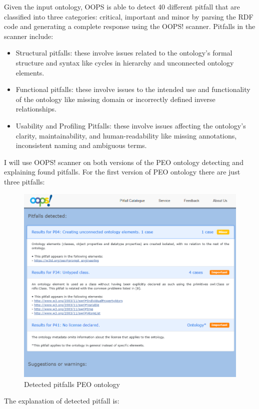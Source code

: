 Given the input ontology, OOPS is able to detect 40 different pitfall that are classified into three categories: critical, important and minor by parsing the RDF code and generating a complete response using the OOPS! scanner. Pitfalls in the scanner include:
\begin{itemize}
    \item Structural pitfalls: these involve issues related to the ontology's formal structure and syntax like cycles in hierarchy and unconnected ontology elements.

    \item Functional pitfalls: these involve issues to the intended use and functionality of the ontology like missing domain or incorrectly defined inverse relationships.

    \item Usability and Profiling Pitfalls: these involve issues  affecting the ontology's clarity, maintainability, and human-readability like missing annotations, inconsistent naming and ambiguous terms.
\end{itemize}
I will use OOPS! scanner on both versions of the PEO ontology detecting and explaining found pitfalls. 
For the first version of PEO ontology there are just three pitfalls:
\begin{figure}[H]
    \centering
    \includegraphics[width=0.9\linewidth]{Figures/fig_43.png}
    \caption{Detected pitfalls PEO ontology}
    \label{fig:enter-label}
\end{figure}
The explanation of detected pitfall is:
